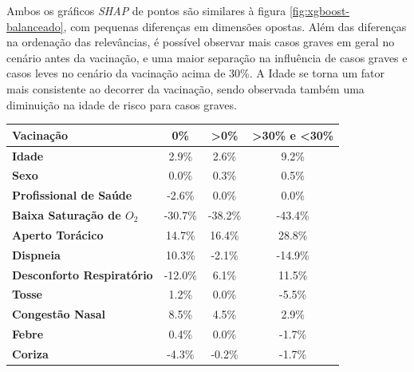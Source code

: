 Ambos os gráficos \textit{SHAP} de pontos são similares à figura \ref{fig:xgboost-balanceado}, com pequenas diferenças em dimensões opostas.
Além das diferenças na ordenação das relevâncias, é possível observar mais casos graves em geral no cenário antes da vacinação, e uma maior separação na influência de casos graves e casos leves no cenário da vacinação acima de 30\%. A Idade se torna um fator mais consistente ao decorrer da vacinação, sendo observada também uma diminuição na idade de risco para casos graves.

\begin{table}[H]
  \centering
  \tiny
  \begin{tabular}{|l|c|c|c|}
    \hline
    Vacinação                            & \textbf{0\%} & \textbf{\textgreater{}0\%} & \textbf{\textgreater{}30\% e \textless{}30\%} \\ \hline
    \textbf{Idade}                       & 2.9\%        & 2.6\%                      & 9.2\%                       \\ \hline
    \textbf{Sexo}                        & 0.0\%        & 0.3\%                      & 0.5\%                       \\ \hline
    \textbf{Profissional de Saúde}       & -2.6\%       & 0.0\%                      & 0.0\%                       \\ \hline
    \textbf{Baixa Saturação de $O_2$}    & -30.7\%      & -38.2\%                    & -43.4\%                     \\ \hline
    \textbf{Aperto Torácico}             & 14.7\%       & 16.4\%                     & 28.8\%                      \\ \hline
    \textbf{Dispneia}                    & 10.3\%       & -2.1\%                     & -14.9\%                     \\ \hline
    \textbf{Desconforto Respiratório}    & -12.0\%      & 6.1\%                      & 11.5\%                      \\ \hline
    \textbf{Tosse}                       & 1.2\%        & 0.0\%                      & -5.5\%                      \\ \hline
    \textbf{Congestão Nasal}             & 8.5\%        & 4.5\%                      & 2.9\%                       \\ \hline
    \textbf{Febre}                       & 0.4\%        & 0.0\%                      & -1.7\%                      \\ \hline
    \textbf{Coriza}                      & -4.3\%       & -0.2\%                     & -1.7\%                      \\ \hline

\end{tabular}
\end{table}
